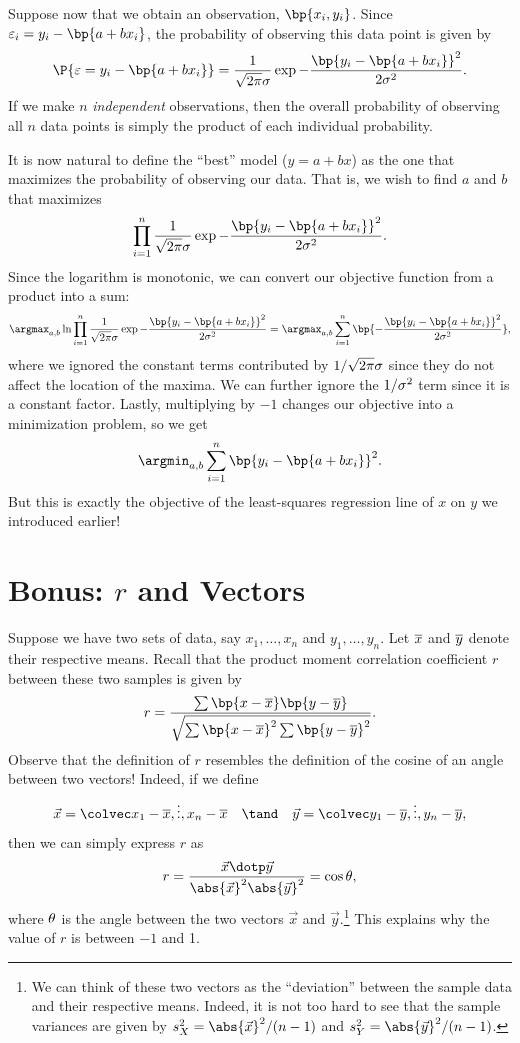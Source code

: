 Suppose now that we obtain an observation, $\bp{x_i, y_i}$. Since $\ve_i = y_i - \bp{a + bx_i}$, the probability of observing this data point is given by \[\P{\ve = y_i - \bp{a + bx_i}} = \frac1{\sqrt{2\pi} \s} \exp{-\frac{\bp{y_i - \bp{a + bx_i}}^2}{2\s^2}}.\] If we make $n$ \emph{independent} observations, then the overall probability of observing all $n$ data points is simply the product of each individual probability.

It is now natural to define the ``best'' model ($y = a + bx$) as the one that maximizes the probability of observing our data. That is, we wish to find $a$ and $b$ that maximizes \[\prod_{i = 1}^n \frac1{\sqrt{2\pi} \s} \exp{-\frac{\bp{y_i - \bp{a + bx_i}}^2}{2\s^2}}.\] Since the logarithm is monotonic, we can convert our objective function from a product into a sum: \[\argmax_{a, b} \ln \prod_{i = 1}^n \frac1{\sqrt{2\pi} \s} \exp{-\frac{\bp{y_i - \bp{a + bx_i}}^2}{2\s^2}} = \argmax_{a, b} \sum_{i = 1}^n \bp{-\frac{\bp{y_i - \bp{a + bx_i}}^2}{2\s^2}},\] where we ignored the constant terms contributed by $1/\sqrt{2\pi} \sigma$ since they do not affect the location of the maxima. We can further ignore the $1/\sigma^2$ term since it is a constant factor. Lastly, multiplying by $-1$ changes our objective into a minimization problem, so we get \[\argmin_{a, b} \sum_{i = 1}^n \bp{y_i - \bp{a + b x_i}}^2.\] But this is exactly the objective of the least-squares regression line of $x$ on $y$ we introduced earlier!

\section{Bonus: $r$ and Vectors}

Suppose we have two sets of data, say $x_1, \dots, x_n$ and $y_1, \dots, y_n$. Let $\overline{x}$ and $\overline{y}$ denote their respective means. Recall that the product moment correlation coefficient $r$ between these two samples is given by \[r = \frac{\sum \bp{x - \ol{x}} \bp{y - \ol{y}}}{\sqrt{\sum \bp{x - \ol{x}}^2 \sum \bp{y - \ol{y}}^2}}.\] Observe that the definition of $r$ resembles the definition of the cosine of an angle between two vectors! Indeed, if we define \[\vec x = \cveciii{x_1 - \ol{x}}{\vdots}{x_n - \ol{x}} \quad \tand \quad \vec y = \cveciii{y_1 - \ol{y}}{\vdots}{y_n - \ol{y}},\] then we can simply express $r$ as \[r = \frac{\vec x \dotp \vec y}{\abs{\vec x}^2 \abs{\vec y}^2} = \cos \t,\] where $\theta$ is the angle between the two vectors $\vec x$ and $\vec y$.\footnote{We can think of these two vectors as the ``deviation'' between the sample data and their respective means. Indeed, it is not too hard to see that the sample variances are given by $s_X^2 = \abs{\vec x}^2/(n-1)$ and $s_Y^2 = \abs{\vec y}^2/(n-1)$.} This explains why the value of $r$ is between $-1$ and 1.

